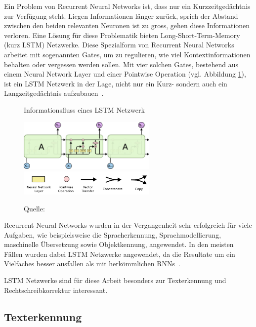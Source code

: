 Ein Problem von Recurrent Neural Networks ist, dass nur ein Kurzzeitgedächtnis zur Verfügung steht. Liegen Informationen länger zurück, sprich der Abstand zwischen den beiden relevanten Neuronen ist zu gross, gehen diese Informationen verloren. Eine Lösung für diese Problematik bieten Long-Short-Term-Memory (kurz LSTM) Netzwerke. Diese Spezialform von Recurrent Neural Networks arbeitet mit sogenannten Gates, um zu regulieren, wie viel Kontextinformationen behalten oder vergessen werden sollen. Mit vier solchen Gates, bestehend aus einem Neural Network Layer und einer Pointwise Operation (vgl. Abbildung \ref{lstm1}), ist ein LSTM Netzwerk in der Lage, nicht nur ein Kurz- sondern auch ein Langzeitgedächtnis aufzubauen~\autocite{Olah2015}.
\begin{figure}[h!]
    \captionsetup{width=.9\linewidth}
    \caption{Informationsfluss eines LSTM Netzwerk}
    \label{lstm1}
    \centering
    \includegraphics[width=0.6\textwidth]{graphics/lstm.png}\\
    \vspace{0.5cm}
    \includegraphics[width=0.6\textwidth]{graphics/lstm-notation.png}\\
    \vspace{0.2cm}
    \caption*{Quelle: \textcite{Olah2015}}
\end{figure}

Recurrent Neural Networks wurden in der Vergangenheit sehr erfolgreich für viele Aufgaben, wie beispielsweise die Spracherkennung, Sprachmodellierung, maschinelle Übersetzung sowie Objektkennung, angewendet. In den meisten Fällen wurden dabei LSTM Netzwerke angewendet, da die Resultate um ein Vielfaches besser ausfallen als mit herkömmlichen RNNs~\autocite{Olah2015}.

LSTM Netzwerke sind für diese Arbeit besonders zur Texterkennung und Rechtschreibkorrektur interessant.

\subsection{Texterkennung}


